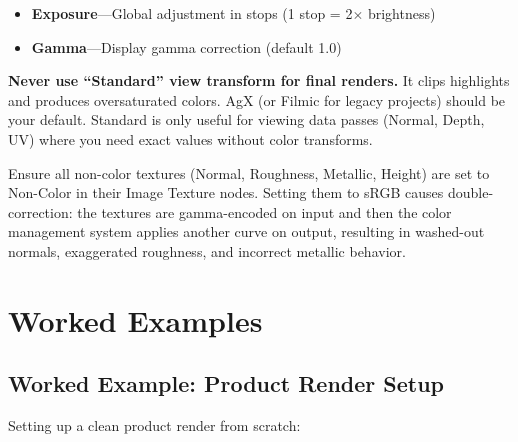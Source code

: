 \begin{itemize}[leftmargin=2em]
  \item \textbf{Exposure}---Global adjustment in stops (1 stop =
        2$\times$ brightness)
  \item \textbf{Gamma}---Display gamma correction (default 1.0)
\end{itemize}

\begin{warningbox}
\textbf{Never use ``Standard'' view transform for final renders.}
It clips highlights and produces oversaturated colors. AgX (or
Filmic for legacy projects) should be your default. Standard is
only useful for viewing data passes (Normal, Depth, UV) where you
need exact values without color transforms.
\end{warningbox}

\begin{tipbox}
Ensure all non-color textures (Normal, Roughness, Metallic, Height)
are set to Non-Color in their Image Texture nodes. Setting them to
sRGB causes double-correction: the textures are gamma-encoded on
input and then the color management system applies another curve on
output, resulting in washed-out normals, exaggerated roughness, and
incorrect metallic behavior.
\end{tipbox}


\section{Worked Examples}
\label{sec:shading:examples}

\subsection{Worked Example: Product Render Setup}

Setting up a clean product render from scratch:

